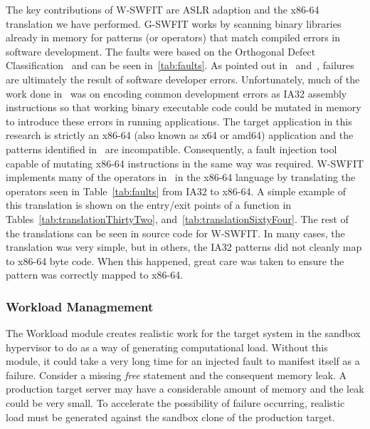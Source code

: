 The key contributions of W-SWFIT are ASLR adaption and the x86-64 translation
we have performed.  G-SWFIT works by scanning binary libraries already in
memory for patterns (or operators) that match compiled errors in software
development.  The faults were based on the Orthogonal Defect
Classification~\cite{bridge1998} and can be seen in~\ref{tab:faults}.  As
pointed out in~\cite{salfnerSurvey} and~\cite{gswfit}, failures are ultimately
the result of software developer errors.  Unfortunately, much of the work done
in~\cite{gswfit} was on encoding common development errors as IA32 assembly
instructions so that working binary executable code could be mutated in memory
to introduce these errors in running applications.  The target application in
this research is strictly an x86-64 (also known as x64 or amd64) application
and the patterns identified in~\cite{gswfit} are incompatible.  Consequently, a
fault injection tool capable of mutating x86-64 instructions in the same way
was required.  W-SWFIT implements many of the operators in~\cite{gswfit} in
the x86-64 language by translating the operators seen in Table~\ref{tab:faults}
from IA32 to x86-64.  A simple example of this translation is shown on the
entry/exit points of a function in Tables~\ref{tab:translationThirtyTwo},
and~\ref{tab:translationSixtyFour}.  The rest of the translations can be seen
in source code for W-SWFIT.  In many cases, the translation was very simple,
but in others, the IA32 patterns did not cleanly map to x86-64 byte code.  When
this happened, great care was taken to ensure the pattern was correctly mapped
to x86-64.

\tabFaults
\tabTranslationThirtyTwo
\tabTranslationSixtyFour

\subsubsection{Workload Managmement} \label{sec:workloadMgr} 
The Workload module creates realistic work for the target system in the sandbox
hypervisor to do as a way of generating computational load.  Without this
module, it could take a very long time for an injected fault to manifest itself
as a failure.  Consider a missing \emph{free} statement and the consequent
memory leak.  A production target server may have a considerable amount of
memory and the leak could be very small.  To accelerate the possibility of
failure occurring, realistic load must be generated against the sandbox clone
of the production target.

